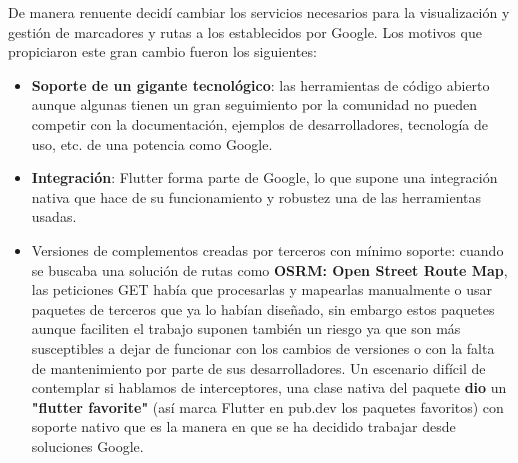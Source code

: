 De manera renuente decidí cambiar los servicios necesarios para la visualización y gestión de marcadores y rutas a los establecidos por Google. Los motivos que propiciaron este gran cambio fueron los siguientes:
\begin{itemize}
	\item \textbf{Soporte de un gigante tecnológico}: las herramientas de código abierto aunque algunas tienen un gran seguimiento por la comunidad no pueden competir con la documentación, ejemplos de desarrolladores, tecnología de uso, etc. de una potencia como Google.
	\item \textbf{Integración}: Flutter forma parte de Google, lo que supone una integración nativa que hace de su funcionamiento y robustez una de las herramientas usadas.
	\item Versiones de complementos creadas por terceros con mínimo soporte: cuando se buscaba una solución de rutas como \textbf{OSRM: Open Street Route Map}, las peticiones GET había que procesarlas y mapearlas manualmente o usar paquetes de terceros que ya lo habían diseñado, sin embargo estos paquetes aunque faciliten el trabajo suponen también un riesgo ya que son más susceptibles a dejar de funcionar con los cambios de versiones o con la falta de mantenimiento por parte de sus desarrolladores. Un escenario difícil de contemplar si hablamos de interceptores, una clase nativa del paquete \textbf{dio} un \textbf{"flutter favorite"} (así marca Flutter en pub.dev los paquetes favoritos) con soporte nativo que es la manera en que se ha decidido trabajar desde soluciones Google.
\end{itemize} 



